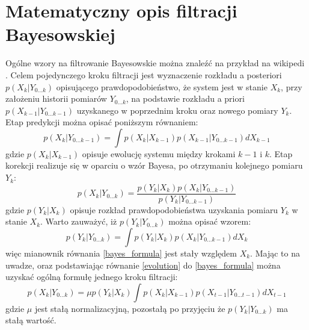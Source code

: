 \section{Matematyczny opis filtracji Bayesowskiej}
Ogólne wzory na filtrowanie Bayesowskie można znaleźć na przykład na wikipedi \cite{wiki_bayes_filter}. Celem pojedynczego kroku filtracji jest wyznaczenie rozkładu a posteriori $p(X_{k}|Y_{0...k})$ opisującego prawdopodobieństwo, że system jest w stanie $X_k$, przy założeniu historii pomiarów $Y_{0...k}$, na podstawie rozkładu a priori $p(X_{k-1}|Y_{0...k-1})$ uzyskanego w poprzednim kroku oraz nowego pomiary $Y_k$. Etap predykcji można opisać poniższym równaniem:
\begin{equation} \label{evolution}
	p(X_k|Y_{0...k-1})=\int p(X_k|X_{k-1})p(X_{k-1}|Y_{0...k-1}) dX_{k-1}
\end{equation}
gdzie $p(X_k|X_{k-1})$ opisuje ewolucję systemu między krokami $k-1$ i $k$. Etap korekcji realizuje się w oparciu o wzór Bayesa, po otrzymaniu kolejnego pomiaru $Y_k$:
\begin{equation}\label{bayes_formula}
	p(X_k|Y_{0...k})=\frac{p(Y_k|X_k)p(X_k|Y_{0...k-1})}{p(Y_k|Y_{0...k-1})}
\end{equation}
gdzie $p(Y_k|X_k)$ opisuje rozkład prawdopodobieństwa uzyskania pomiaru $Y_k$ w stanie $X_k$. Warto zauważyć, iż $p(Y_k|Y_{0...k})$ można opisać wzorem:
\begin{equation}
p(Y_k|Y_{0...k})=\int p(Y_k|X_k)p(X_k|Y_{0...k-1}) dX_k
\end{equation}
więc mianownik równania \ref{bayes_formula} jest stały względem $X_k$. Mając to na uwadze, oraz podstawiając równanie \ref{evolution} do \ref{bayes_formula} można uzyskać ogólną formułę jednego kroku filtracji:
\begin{equation}
	p(X_k|Y_{0...k})=\mu p(Y_k|X_k)\int p(X_k|X_{k-1})p(X_{t-1}|Y_{0...t-1}) dX_{t-1}
\end{equation}
gdzie $\mu$ jest stałą normalizacyjną, pozostałą po przyjęciu że $p(Y_k|Y_{0...k})$ ma stałą wartość.
